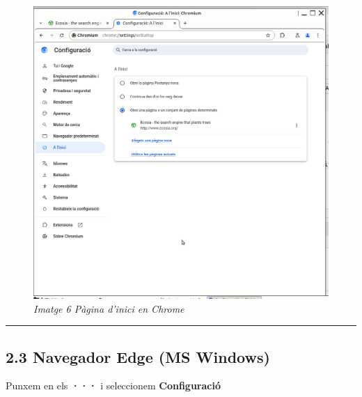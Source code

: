 \documentclass[
  a4paper,
]{article}
\begin{document}
\begin{figure}
\centering
\includegraphics{png/3-Chrome-Inici.png}
\caption{\emph{Imatge 6 Pàgina d'inici en Chrome}}
\end{figure}

\begin{center}\rule{0.5\linewidth}{0.5pt}\end{center}

\subsection{2.3 Navegador Edge (MS
Windows)}\label{navegador-edge-ms-windows}

Punxem en els \textbf{···} i seleccionem \textbf{Configuració}
\end{document}
